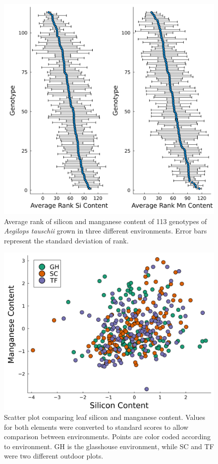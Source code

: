 \documentclass[12pt, letterpaper, ]{report}
\begin{document}
\begin{figure}[h]
        \includegraphics[scale=0.048]{images/rank_plots.png}
        \centering
        \caption{Average rank of silicon and manganese content of 113 genotypes of \textit{Aegilops tauschii} grown in three different environments. Error bars represent the standard deviation of rank.}
        \label{Fig:rank_plots}
\end{figure}

\begin{figure}[h]
        \includegraphics[scale=0.048]{images/si_mn_regression.png}
        \centering
        \caption{Scatter plot comparing leaf silicon and manganese content. Values for both elements were converted to standard scores to allow
        comparison between environments. Points are color coded according to environment. GH is the glasshouse environment, while SC and TF were two different outdoor plots.}
        \label{Fig:mn_si_regression}
\end{figure}
\end{document}
